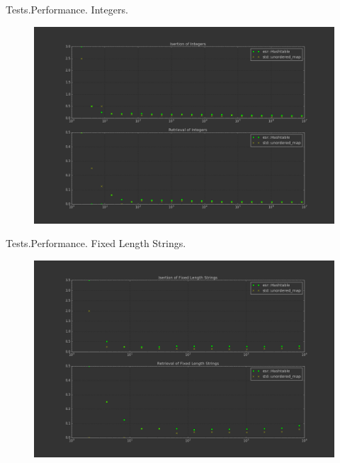 \documentclass{beamer}
\begin{document}
\begin{frame}{Tests.}{Performance. Integers.}
  \begin{figure}
    \includegraphics[scale=0.3]{int_perf}
  \end{figure}
\end{frame}

\begin{frame}{Tests.}{Performance. Fixed Length Strings.}
  \begin{figure}
    \includegraphics[scale=0.3]{fstr_perf}
  \end{figure}
\end{frame}
\end{document}
